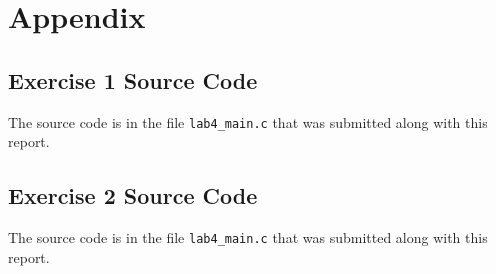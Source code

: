 \documentclass[11pt, letterpaper, titlepage]{article}
\begin{document}
\section{Appendix}

\subsection{Exercise 1 Source Code}
The source code is in the file \texttt{lab4_main.c} that was submitted along with this report.

\subsection{Exercise 2 Source Code}
The source code is in the file \texttt{lab4_main.c} that was submitted along with this report.
\end{document}
